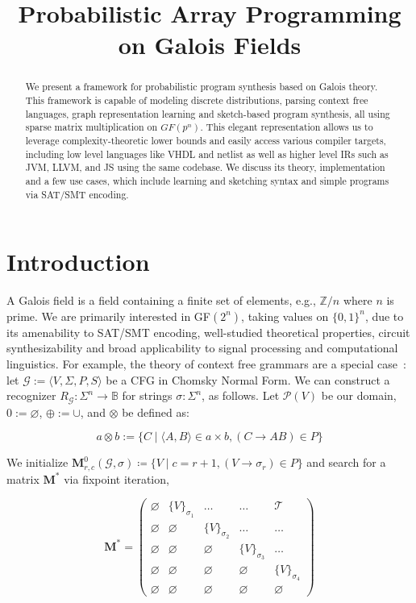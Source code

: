 \documentclass[sigplan,10pt,review,anonymous]{acmart}
\begin{document}
\title{Probabilistic Array Programming on Galois Fields}
\begin{abstract}
We present a framework for probabilistic program synthesis based on Galois theory. This framework is capable of modeling discrete distributions, parsing context free languages, graph representation learning and sketch-based program synthesis, all using sparse matrix multiplication on $GF(p^n)$. This elegant representation allows us to leverage complexity-theoretic lower bounds and easily access various compiler targets, including low level languages like VHDL and netlist as well as higher level IRs such as JVM, LLVM, and JS using the same codebase. We discuss its theory, implementation and a few use cases, which include learning and sketching syntax and simple programs via SAT/SMT encoding.
\end{abstract}
\maketitle

\section{Introduction}

A Galois field is a field containing a finite set of elements, e.g., $\mathbb{Z}/n$ where $n$ is prime. We are primarily interested in GF$(2^n)$, taking values on $\{0, 1\}^n$, due to its amenability to SAT/SMT encoding, well-studied theoretical properties, circuit synthesizability and broad applicability to signal processing and computational linguistics. For example, the theory of context free grammars are a special case~\citep{jansson2016certified, bakinova2020formal}: let $\mathcal{G} := \langle V, \Sigma, P, S\rangle$ be a CFG in Chomsky Normal Form. We can construct a recognizer $R_\mathcal{G}: \Sigma^n \rightarrow \mathbb{B}$ for strings $\sigma: \Sigma^n$, as follows. Let $\mathcal P(V)$ be our domain, $0 := \varnothing$, $\oplus := \cup$, and $\otimes$ be defined as:

\vspace{-7pt}
\[
a \otimes b := \{C \mid \langle A, B\rangle \in a \times b, (C\rightarrow AB) \in P\}
\]

\noindent We initialize $\mathbf{M}^0_{r,c}(\mathcal{G}, \sigma) \coloneqq \{V \mid c = r + 1, (V \rightarrow \sigma_r) \in P\}$ and search for a matrix $\mathbf{M}^*$ via fixpoint iteration,

\vspace{-5}
\[
\mathbf{M}^* = \begin{pmatrix}
            \varnothing & \{V\}_{\sigma_1} & \ldots & \ldots & \mathcal{T} \\
            \varnothing & \varnothing & \{V\}_{\sigma_2} & \ldots & \ldots \\
            \varnothing & \varnothing & \varnothing & \{V\}_{\sigma_3} & \ldots \\
            \varnothing & \varnothing & \varnothing & \varnothing & \{V\}_{\sigma_4} \\
            \varnothing & \varnothing & \varnothing & \varnothing & \varnothing
\end{pmatrix}
\]
\end{document}
